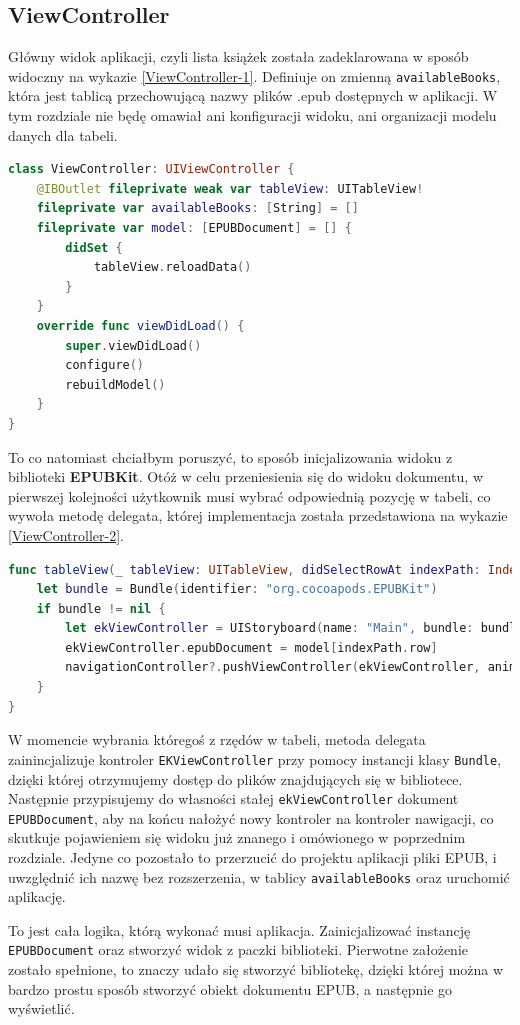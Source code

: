 \subsection{ViewController}

Główny widok aplikacji, czyli lista książek została zadeklarowana w sposób widoczny na wykazie \ref{ViewController-1}. Definiuje on zmienną \texttt{availableBooks}, która jest tablicą przechowującą nazwy plików .epub dostępnych w aplikacji. W tym rozdziale nie będę omawiał ani konfiguracji widoku, ani organizacji modelu danych dla tabeli.

\begin{lstlisting}[caption={Deklaracja klasy \texttt{UIViewController}}, language=swift, label=ViewController-1]
class ViewController: UIViewController {
    @IBOutlet fileprivate weak var tableView: UITableView!
    fileprivate var availableBooks: [String] = []
    fileprivate var model: [EPUBDocument] = [] {
        didSet {
            tableView.reloadData()
        }
    }
    override func viewDidLoad() {
        super.viewDidLoad()
        configure()
        rebuildModel()
    }
}
\end{lstlisting}

To co natomiast chciałbym poruszyć, to sposób inicjalizowania widoku z biblioteki \textbf{EPUBKit}. Otóż w celu przeniesienia się do widoku dokumentu, w pierwszej kolejności użytkownik musi wybrać odpowiednią pozycję w tabeli, co wywoła metodę delegata, której implementacja została przedstawiona na wykazie \ref{ViewController-2}.

\begin{lstlisting}[caption={Deklaracja metody delegata \texttt{UITableView}}, language=swift, label=ViewController-2]
func tableView(_ tableView: UITableView, didSelectRowAt indexPath: IndexPath) {
    let bundle = Bundle(identifier: "org.cocoapods.EPUBKit")
    if bundle != nil {
        let ekViewController = UIStoryboard(name: "Main", bundle: bundle).instantiateViewController(withIdentifier: "EKViewController") as! EKViewController
        ekViewController.epubDocument = model[indexPath.row]
        navigationController?.pushViewController(ekViewController, animated: true)
    }
}
\end{lstlisting}

W momencie wybrania któregoś z rzędów w tabeli, metoda delegata zainincjalizuje kontroler \texttt{EKViewController} przy pomocy instancji klasy \texttt{Bundle}, dzięki której otrzymujemy dostęp do plików znajdujących się w bibliotece. Następnie przypisujemy do własności stałej \texttt{ekViewController} dokument \texttt{EPUBDocument}, aby na końcu nałożyć nowy kontroler na kontroler nawigacji, co skutkuje pojawieniem się widoku już znanego i omówionego w poprzednim rozdziale. Jedyne co pozostało to przerzucić do projektu aplikacji pliki EPUB, i uwzględnić ich nazwę bez rozszerzenia, w tablicy \texttt{availableBooks} oraz uruchomić aplikację.

To jest cała logika, którą wykonać musi aplikacja. Zainicjalizować instancję \texttt{EPUBDocument} oraz stworzyć widok z paczki biblioteki. Pierwotne założenie zostało spełnione, to znaczy udało się stworzyć bibliotekę, dzięki której można w bardzo prostu sposób stworzyć obiekt dokumentu EPUB, a następnie go wyświetlić.
